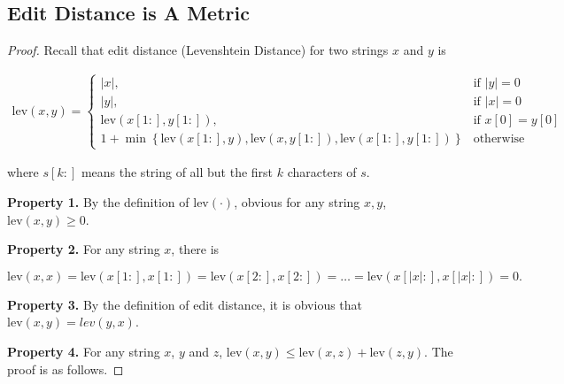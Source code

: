 \documentclass{article}
\begin{document}
\subsection{Edit Distance is A Metric}
\vspace{1em}
\begin{proof}
    Recall that edit distance (Levenshtein Distance) for two strings $x$ and $y$ is

    \vspace{-1.5em}
    \begin{align*}
        \mathrm{lev}(x,y) = 
        \left\{
            \begin{array}{ll}
                |x|, & \text{if $|y|=0$} \\
                |y|, & \text{if $|x|=0$} \\
                \mathrm{lev}(x[1:], y[1:]), & \text{if $x[0]=y[0]$} \\
                1+\min\left\{
                        \mathrm{lev}(x[1:],y),
                        \mathrm{lev}(x,y[1:]),
                        \mathrm{lev}(x[1:],y[1:])
                \right\}
                &
                \text{otherwise}
            \end{array}
        \right.
    \end{align*}

    \hspace{1.3em}
    where $s[k:]$ means the string of all but the first $k$ characters of $s$.

    \vspace{1em} \hspace{1.3em}
    \textbf{Property 1.} By the definition of $\mathrm{lev}(\cdot)$, obvious for any string $x,y$, $\mathrm{lev}(x,y)\geq 0$.

    \hspace{1.3em}
    \textbf{Property 2.} For any string $x$, there is

    \vspace{-1em}
    $$\mathrm{lev}(x,x) = \mathrm{lev}(x[1:],x[1:]) = \mathrm{lev}(x[2:],x[2:]) = \dots = \mathrm{lev}(x\left[|x|:\right], x\left[|x|:\right]) = 0.$$

    \hspace{1.3em}
    \textbf{Property 3.} By the definition of edit distance, it is obvious that $\mathrm{lev}(x,y)={lev}(y,x)$.

    \hspace{1.3em}
    \textbf{Property 4.} For any string $x$, $y$ and $z$, $\mathrm{lev}(x,y)\le \mathrm{lev}(x,z)+\mathrm{lev}(z,y).$ The proof is as follows.


\end{proof}
\end{document}
